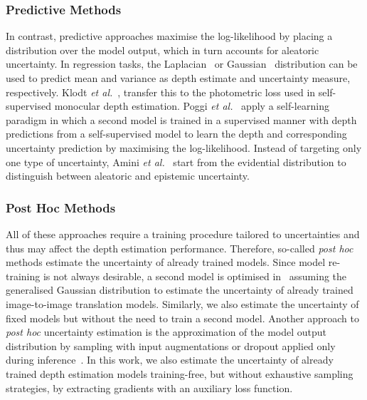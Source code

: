 \subsubsection{Predictive Methods}
In contrast, predictive approaches maximise the log-likelihood by placing a distribution over the model output, which in turn accounts for aleatoric uncertainty. In regression tasks, the Laplacian~\cite{Ilg2018UncertaintyEA} or Gaussian~\cite{Nix1994EstimatingTM} distribution can be used to predict mean and variance as depth estimate and uncertainty measure, respectively. Klodt \textit{et al.}~\cite{Klodt2018SupervisingTN}, transfer this to the photometric loss used in self-supervised monocular depth estimation. Poggi \textit{et al.}~\cite{Poggi2020OnTU} apply a self-learning paradigm in which a second model is trained in a supervised manner with depth predictions from a self-supervised model to learn the depth and corresponding uncertainty prediction by maximising the log-likelihood. 
Instead of targeting only one type of uncertainty, Amini \textit{et al.}~\cite{amini2020deep} start from the evidential distribution to distinguish between aleatoric and epistemic uncertainty.
\subsubsection{Post Hoc Methods}
All of these approaches require a training procedure tailored to uncertainties and thus may affect the depth estimation performance. Therefore, so-called \textit{post hoc} methods estimate the uncertainty of already trained models. Since model re-training is not always desirable, a second model is optimised in~\cite{Upadhyay2022BayesCapBI} assuming the generalised Gaussian distribution to estimate the uncertainty of already trained image-to-image translation models. Similarly, we also estimate the uncertainty of fixed models but without the need to train a second model. Another approach to \textit{post hoc} uncertainty estimation is the approximation of the model output distribution by sampling with input augmentations or dropout applied only during inference~\cite{Mi2019TrainingFreeUE}. In this work, we also estimate the uncertainty of already trained depth estimation models training-free, but without exhaustive sampling strategies, by extracting gradients with an auxiliary loss function. 

